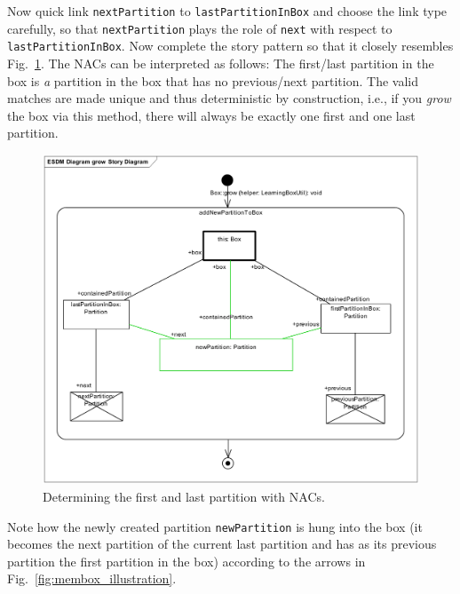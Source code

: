 Now quick link \texttt{nextPartition} to \texttt{lastPartitionInBox} and choose
the link type carefully, so that \texttt{nextPartition} plays the role of
\texttt{next} with respect to \texttt{lastPartitionInBox}.  Now complete the
story pattern so that it closely resembles Fig.~\ref{fig:sdm_grow_3}.  The
\mbox{NACs} can be interpreted as follows:  The first/last partition in the box
is \emph{a} partition in the box that has no previous/next partition.  The
valid matches are made unique and thus deterministic by construction, i.e., if
you \emph{grow} the box via this method, there will always be exactly one first
and one last partition.  

\begin{figure}[htbp]
\begin{center}
  \includegraphics[width=\textwidth]{pics/sdmBilder/grow/sdm65} 
  \caption{Determining the first and last partition with NACs.}  
  \label{fig:sdm_grow_3}
\end{center}
\end{figure}
 
Note how the newly created partition
\texttt{newPartition} is hung into the box (it becomes the next partition of the
current last partition and has as its previous partition the first partition
in the box) according to the arrows in Fig.~\ref{fig:membox_illustration}.
  
